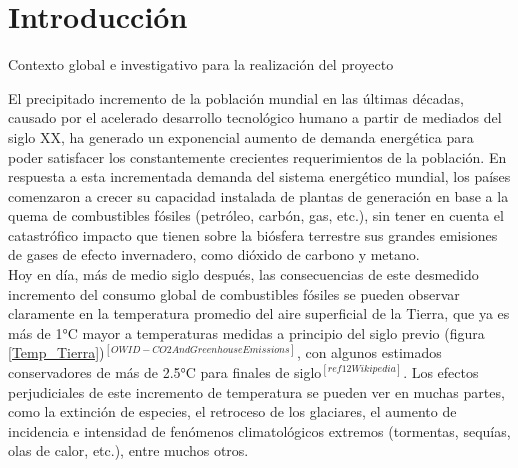 \section{Introducción}

\vspace{0.5cm}

\Large\scshape
\begin{center}
    Contexto global e investigativo para la realización del proyecto
\end{center}
\normalfont

\divider

El precipitado incremento de la población mundial en las últimas décadas, causado por el acelerado desarrollo tecnológico humano a partir de mediados del siglo XX, ha generado un exponencial aumento de demanda energética para poder satisfacer los constantemente crecientes requerimientos de la población. En respuesta a esta incrementada demanda del sistema energético mundial, los países comenzaron a crecer su capacidad instalada de plantas de generación en base a la quema de combustibles fósiles (petróleo, carbón, gas, etc.), sin tener en cuenta el catastrófico impacto que tienen sobre la biósfera terrestre sus grandes emisiones de gases de efecto invernadero, como dióxido de carbono y metano.\\

Hoy en día, más de medio siglo después, las consecuencias de este desmedido incremento del consumo global de combustibles fósiles se pueden observar claramente en la temperatura promedio del aire superficial de la Tierra, que ya es más de 1°C mayor a temperaturas medidas a principio del siglo previo (figura \ref{Temp_Tierra})$^{[OWID-CO2AndGreenhouseEmissions]}$, con algunos estimados conservadores de más de 2.5°C para finales de siglo$^{[ref 12 Wikipedia]}$. Los efectos perjudiciales de este incremento de temperatura se pueden ver en muchas partes, como la extinción de especies, el retroceso de los glaciares, el aumento de incidencia e intensidad de fenómenos climatológicos extremos (tormentas, sequías, olas de calor, etc.), entre muchos otros.

